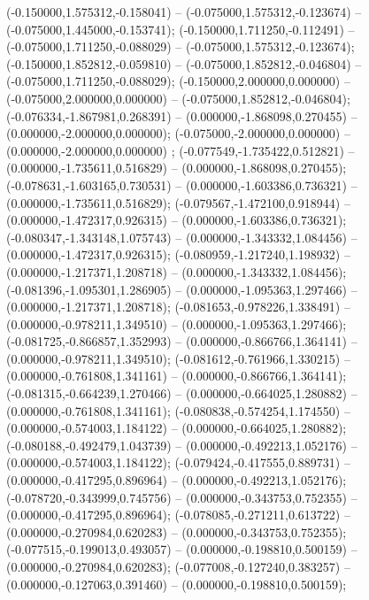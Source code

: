  (-0.150000,1.575312,-0.158041) -- (-0.075000,1.575312,-0.123674) -- (-0.075000,1.445000,-0.153741);
 (-0.150000,1.711250,-0.112491) -- (-0.075000,1.711250,-0.088029) -- (-0.075000,1.575312,-0.123674);
 (-0.150000,1.852812,-0.059810) -- (-0.075000,1.852812,-0.046804) -- (-0.075000,1.711250,-0.088029);
 (-0.150000,2.000000,0.000000) -- (-0.075000,2.000000,0.000000) -- (-0.075000,1.852812,-0.046804);
 (-0.076334,-1.867981,0.268391) -- (0.000000,-1.868098,0.270455) -- (0.000000,-2.000000,0.000000);
 (-0.075000,-2.000000,0.000000) -- (0.000000,-2.000000,0.000000) ;
 (-0.077549,-1.735422,0.512821) -- (0.000000,-1.735611,0.516829) -- (0.000000,-1.868098,0.270455);
 (-0.078631,-1.603165,0.730531) -- (0.000000,-1.603386,0.736321) -- (0.000000,-1.735611,0.516829);
 (-0.079567,-1.472100,0.918944) -- (0.000000,-1.472317,0.926315) -- (0.000000,-1.603386,0.736321);
 (-0.080347,-1.343148,1.075743) -- (0.000000,-1.343332,1.084456) -- (0.000000,-1.472317,0.926315);
 (-0.080959,-1.217240,1.198932) -- (0.000000,-1.217371,1.208718) -- (0.000000,-1.343332,1.084456);
 (-0.081396,-1.095301,1.286905) -- (0.000000,-1.095363,1.297466) -- (0.000000,-1.217371,1.208718);
 (-0.081653,-0.978226,1.338491) -- (0.000000,-0.978211,1.349510) -- (0.000000,-1.095363,1.297466);
 (-0.081725,-0.866857,1.352993) -- (0.000000,-0.866766,1.364141) -- (0.000000,-0.978211,1.349510);
 (-0.081612,-0.761966,1.330215) -- (0.000000,-0.761808,1.341161) -- (0.000000,-0.866766,1.364141);
 (-0.081315,-0.664239,1.270466) -- (0.000000,-0.664025,1.280882) -- (0.000000,-0.761808,1.341161);
 (-0.080838,-0.574254,1.174550) -- (0.000000,-0.574003,1.184122) -- (0.000000,-0.664025,1.280882);
 (-0.080188,-0.492479,1.043739) -- (0.000000,-0.492213,1.052176) -- (0.000000,-0.574003,1.184122);
 (-0.079424,-0.417555,0.889731) -- (0.000000,-0.417295,0.896964) -- (0.000000,-0.492213,1.052176);
 (-0.078720,-0.343999,0.745756) -- (0.000000,-0.343753,0.752355) -- (0.000000,-0.417295,0.896964);
 (-0.078085,-0.271211,0.613722) -- (0.000000,-0.270984,0.620283) -- (0.000000,-0.343753,0.752355);
 (-0.077515,-0.199013,0.493057) -- (0.000000,-0.198810,0.500159) -- (0.000000,-0.270984,0.620283);
 (-0.077008,-0.127240,0.383257) -- (0.000000,-0.127063,0.391460) -- (0.000000,-0.198810,0.500159);
